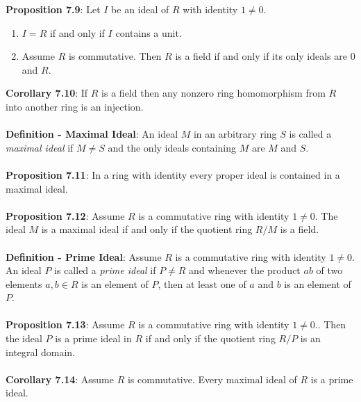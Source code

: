 \documentclass{article}
\begin{document}
\textbf{Proposition 7.9}: Let $I$ be an ideal of $R$ with identity $1 \neq 0$. \begin{enumerate}
    \item $I = R$ if and only if $I$ contains a unit.
    \item Assume $R$ is commutative. Then $R$ is a field if and only if its only ideals are $0$ and $R$.
\end{enumerate} $ $ \\
\textbf{Corollary 7.10}: If $R$ is a field then any nonzero ring homomorphism from $R$ into another ring is an injection. \\ \\
\textbf{Definition - Maximal Ideal}: An ideal $M$ in an arbitrary ring $S$ is called a \textit{maximal ideal} if $M \neq S$ and the only ideals containing $M$ are $M$ and $S$. \\ \\
\textbf{Proposition 7.11}: In a ring with identity every proper ideal is contained in a maximal ideal. \\ \\
\textbf{Proposition 7.12}: Assume $R$ is a commutative ring with identity $1 \neq 0$. The ideal $M$ is a maximal ideal if and only if the quotient ring $R/M$ is a field. \\ \\
\textbf{Definition - Prime Ideal}: Assume $R$ is a commutative ring with identity $1 \neq 0$. An ideal $P$ is called a \textit{prime ideal} if $P \neq R$ and whenever the product $ab$ of two elements $a, b \in R$ is an element of $P$, then at least one of $a$ and $b$ is an element of $P$. \\ \\
\textbf{Proposition 7.13}: Assume $R$ is a commutative ring with identity $1 \neq 0$.. Then the ideal $P$ is a prime ideal in $R$ if and only if the quotient ring $R/P$ is an integral domain. \\ \\
\textbf{Corollary 7.14}: Assume $R$ is commutative. Every maximal ideal of $R$ is a prime ideal. \\ \\
\end{document}
